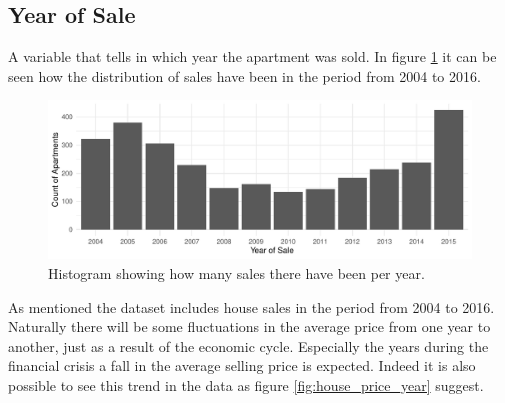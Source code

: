 \subsection*{Year of Sale}
A variable that tells in which year the apartment was sold.
In figure \ref{fig:year_of_sale_histogram} it can be seen how the distribution of sales have been in the period from 2004 to 2016.
\begin{figure}[H]
    \centering
    \includegraphics[width = 0.8 \textwidth]{figures/Data_introduction/year_of_sale_histogram.pdf}
    \caption{Histogram showing how many sales there have been per year.}
    \label{fig:year_of_sale_histogram}
\end{figure}
As mentioned the dataset includes house sales in the period from 2004 to 2016.
Naturally there will be some fluctuations in the average price from one year to another, just as a result of the economic cycle.
Especially the years during the financial crisis a fall in the average selling price is expected.
Indeed it is also possible to see this trend in the data as figure \ref{fig:house_price_year} suggest.

